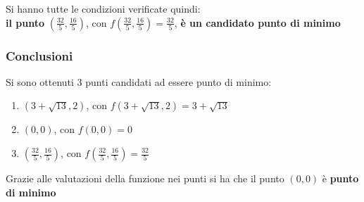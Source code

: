 \documentclass[a4paper,12pt, oneside]{book}
\begin{document}
Si hanno tutte le condizioni verificate quindi:\\
\textbf{il punto} $\left(\frac{32}{5}, \frac{16}{5}\right)$, con
$f\left(\frac{32}{5}, \frac{16}{5}\right)=\frac{32}{5}$, \textbf{è  
  un candidato punto di minimo}
\newpage
\subsubsection{Conclusioni}
\begin{shaded}
  Si sono ottenuti 3 punti candidati ad essere punto di minimo:
  \begin{enumerate}
    \item $(3+\sqrt{13},2)$, con $f(3+\sqrt{13},2)=3+\sqrt{13}$
    \item $(0,0)$, con $f(0,0)=0$
    \item $\left(\frac{32}{5}, \frac{16}{5}\right)$, con
    $f\left(\frac{32}{5}, \frac{16}{5}\right)=\frac{32}{5}$ 
  \end{enumerate}
  Grazie alle valutazioni della funzione nei punti si ha che il punto
  $(0,0)$ è \textbf{punto di minimo}
\end{shaded}
\end{document}
